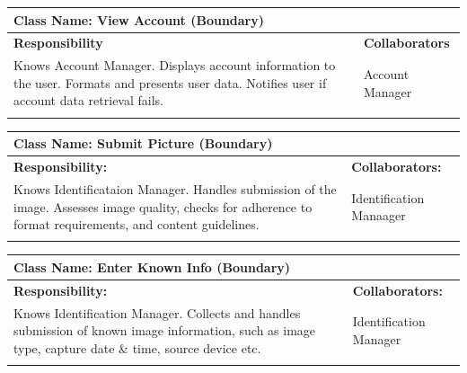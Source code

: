 \documentclass[]{article}
\begin{document}
	\begin{table}[H]
		\centering
		\begin{tabular}{|p{8cm}|p{8cm}|}
		\hline 
		\multicolumn{2}{|l|}{\textbf{Class Name:} View Account (Boundary)} \\
		\hline
		\textbf{Responsibility} & \textbf{Collaborators} \\
		\hline
		Knows Account Manager. \newline
		Displays account information to the user. \newline
		Formats and presents user data. \newline
		Notifies user if account data retrieval fails. 
		& Account Manager \\
		\vspace{1in} & \\
		\hline
		\end{tabular}
	\end{table}
	

	\begin{table}[H]
		\centering
		\begin{tabular}{|p{8cm}|p{8cm}|}
		\hline 
		 \multicolumn{2}{|l|}{\textbf{Class Name:} Submit Picture (Boundary)} \\
		\hline
		\textbf{Responsibility:} & \textbf{Collaborators:} \\
		\hline
		Knows Identificataion Manager. \newline Handles submission of the image. \newline Assesses image quality, checks for adherence to format requirements, and content guidelines. & Identification Manaager \\
		\vspace{1in} & \\
		\hline
		\end{tabular}
	\end{table}

	\begin{table}[H]
		\centering
		\begin{tabular}{|p{8cm}|p{8cm}|}
		\hline 
		 \multicolumn{2}{|l|}{\textbf{Class Name:} Enter Known Info (Boundary)} \\
		\hline
		\textbf{Responsibility:} & \textbf{Collaborators:} \\
		\hline
		Knows Identification Manager. \newline Collects and handles submission of known image information, such as image type, capture date \& time, source device etc. & Identification Manager \\
		\vspace{1in} & \\
		\hline 
		\end{tabular}
	\end{table}
\end{document}
